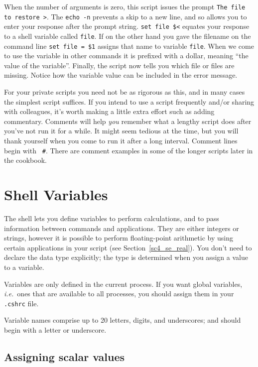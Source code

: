 \documentclass[twoside,11pt]{article}
\newcommand{\htmlref}[2]{#1}
\newcommand{\xlabel}[1]{}
\newcommand{\latexelsehtml}[2]{#1}
\newcommand{\latexelsehtml}[2]{#2}
\begin{document}
When the number of arguments is zero, this script issues the prompt
{\tt The file to restore >}.  The {\tt echo -n} prevents a skip to a
new line, and so allows you to enter your response after the prompt
string.  {\tt set file \$<} equates your response to a \htmlref{{\sf shell
variable}}{sc4_gl_she_var} called {\tt file}.  If on the other hand you gave the
filename on the command line {\tt set file = \$1} assigns that name to
variable {\tt file}.  When we come to use the variable in other commands
it is prefixed with a dollar, meaning ``the value of the variable''.
Finally, the script now tells you which file or files are missing.
Notice how the variable value can be included in the error message.

For your private scripts you need not be as rigorous as this, and in
many cases the simplest script suffices.  If you intend to use a script
frequently and/or sharing with colleagues, it's worth making a little
extra effort such as adding commentary.  Comments will help {\em you\/}
remember what a lengthy script does after you've not run it for a while.
It might seem tedious at the time, but you will thank yourself when you
come to run it after a long interval.  Comment lines begin with {\tt
\#}.  There are comment examples in some of the longer scripts later in
the cookbook.

\newpage
\section{\xlabel{sc4_se_variables}Shell Variables\label{sc4_se_variables}}

The shell lets you define variables to perform calculations, and to
pass information between commands and applications.  They are either
integers or strings, however it is possible to perform floating-point
arithmetic by using certain applications in your script (see
\latexelsehtml{Section~\ref{sc4_se_real}).}{\htmlref{here}{sc4_se_real}).}
You don't need to declare the data type explicitly; the type is
determined when you assign a value to a variable.

Variables are only defined in the \htmlref{{\sf current
process}}{sc4_gl_cur}.  If you want global variables, {\it i.e.}\ ones
that are available to all processes, you should assign them in your
{\tt .cshrc} file.

Variable names comprise up to 20 letters, digits, and underscores;
and should begin with a letter or underscore.

\subsection{\xlabel{sc4_se_assign_scalar}Assigning scalar values
\label{sc4_se_assign_scalar}}
\end{document}
